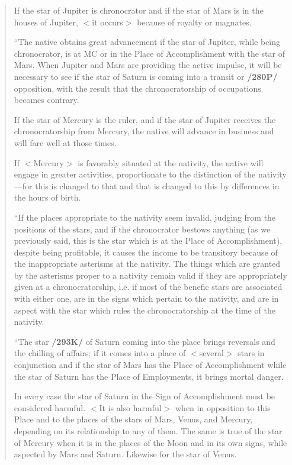 \begin{quote}
If the star of Jupiter is chronocrator and if the star of Mars is in the houses of Jupiter, $<$it occurs$>$ because of royalty or magnates.

“The native obtains great advancement if the star of Jupiter, while being chronocrator, is at MC or in the Place of Accomplishment with the star of Mars. When Jupiter and Mars are providing the
active impulse, it will be necessary to see if the star of Saturn is coming into a transit or \textbf{/280P/} opposition, with the result that the chronocratorship of occupations becomes contrary. 

If the star of Mercury is the ruler, and if the star of Jupiter receives the chronocratorship from Mercury, the native will advance in business and will fare well at those times. 

If $<$Mercury$>$ is favorably situated at the nativity, the native will engage in greater activities, proportionate to the distinction of the nativity—for this is changed to that and that is changed to this by differences in the hours of birth.

“If the places appropriate to the nativity seem invalid, judging from the positions of the stars, and if the chronocrator bestows anything (as we previously said, this is the star which is at the Place of Accomplishment), despite being profitable, it causes the income to be transitory because of the inappropriate asterisms at the nativity. The things which are granted by the asterisms proper to a nativity remain valid if they are appropriately given at a chronocratorship, i.e. if most of the benefic stars are associated with either one, are in the signs which pertain to the nativity, and are in aspect with the star which rules the chronocratorship at the time of the nativity.

“The star \textbf{/293K/} of Saturn coming into the place brings reversals and the chilling of affairs; if it comes into a place of $<$several$>$ stars in conjunction and if the star of Mars has the Place of Accomplishment while the star of Saturn has the Place of Employments, it brings mortal danger. 

In every case the star of Saturn in the Sign of Accomplishment must be considered harmful. $<$It is also harmful$>$ when in opposition to this Place and to the places of the stars of Mars, Venus, and Mercury, depending on its relationship to any of them. The same is true of the star of Mercury when it is in the places of the Moon and in its own signs, while aspected by Mars and Saturn. Likewise for the star of Venus. 


\end{quote}
